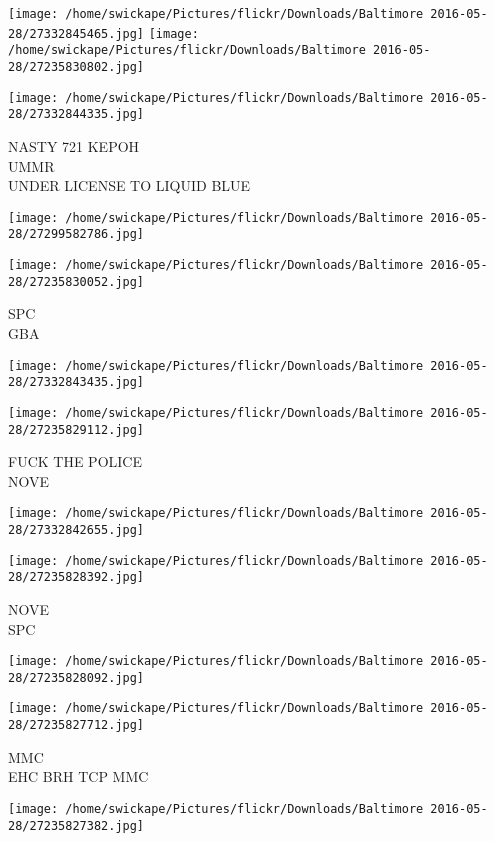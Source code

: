 \documentclass[10pt,letterpaper]{article}
\begin{document}
\texttt{[image: /home/swickape/Pictures/flickr/Downloads/Baltimore 2016-05-28/27332845465.jpg]}
\texttt{[image: /home/swickape/Pictures/flickr/Downloads/Baltimore 2016-05-28/27235830802.jpg]}

\texttt{[image: /home/swickape/Pictures/flickr/Downloads/Baltimore 2016-05-28/27332844335.jpg]}

NASTY 721 KEPOH\\
UMMR\\
UNDER LICENSE TO LIQUID BLUE
\pagebreak

\texttt{[image: /home/swickape/Pictures/flickr/Downloads/Baltimore 2016-05-28/27299582786.jpg]}

\vspace{0.25in}
\texttt{[image: /home/swickape/Pictures/flickr/Downloads/Baltimore 2016-05-28/27235830052.jpg]}

SPC\\
GBA
\pagebreak

\texttt{[image: /home/swickape/Pictures/flickr/Downloads/Baltimore 2016-05-28/27332843435.jpg]}

\vspace{0.25in}
\texttt{[image: /home/swickape/Pictures/flickr/Downloads/Baltimore 2016-05-28/27235829112.jpg]}

FUCK THE POLICE\\
NOVE
\pagebreak

\texttt{[image: /home/swickape/Pictures/flickr/Downloads/Baltimore 2016-05-28/27332842655.jpg]}

\vspace{0.25in}
\texttt{[image: /home/swickape/Pictures/flickr/Downloads/Baltimore 2016-05-28/27235828392.jpg]}

NOVE\\
SPC
\pagebreak

\texttt{[image: /home/swickape/Pictures/flickr/Downloads/Baltimore 2016-05-28/27235828092.jpg]}

\vspace{0.25in}
\texttt{[image: /home/swickape/Pictures/flickr/Downloads/Baltimore 2016-05-28/27235827712.jpg]}

MMC\\
EHC BRH TCP MMC
\pagebreak

\texttt{[image: /home/swickape/Pictures/flickr/Downloads/Baltimore 2016-05-28/27235827382.jpg]}
\end{document}
